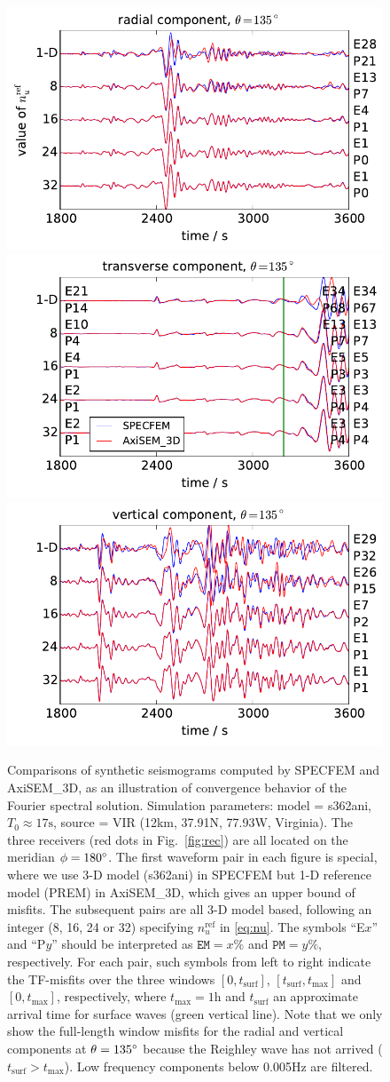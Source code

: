 \documentclass[extra,referee]{gji}
\begin{document}
\begin{figure}
  \includegraphics[width=.35\textwidth]{fig/conv_seism/VIR_s3_17_135xxx_R.pdf}\hspace{-15pt}
  \includegraphics[width=.35\textwidth]{fig/conv_seism/VIR_s3_17_135xxx_T.pdf}\hspace{-15pt}
  \includegraphics[width=.35\textwidth]{fig/conv_seism/VIR_s3_17_135xxx_Z.pdf}\vspace{-5pt}
  \caption{Comparisons of synthetic seismograms computed by SPECFEM and AxiSEM\_3D,
  as an illustration of convergence behavior of the Fourier spectral solution. 
  Simulation parameters: model = s362ani, $T_0\approx17\text{s}$, 
  source = VIR (12km, 37.91\degr N, 77.93\degr W, Virginia).
  The three receivers (red dots in Fig.~\ref{fig:rec})
  are all located on the meridian $\phi=180\hbox{$^\circ$}$. 
  The first waveform pair in each figure is special, where we use 3-D model (s362ani)
  in SPECFEM but 1-D reference model (PREM) in AxiSEM\_3D, which gives
  an upper bound of misfits. The subsequent pairs are all 3-D model based, 
  following an integer (8, 16, 24 or 32) specifying $n_u^\text{ref}$ in \eqref{eq:nu}. 
  The symbols ``E$x$'' and ``P$y$'' should be interpreted as 
  $\mathtt{EM}=x\%$ and $\mathtt{PM}=y\%$, respectively.
  For each pair, such symbols from left to right indicate the TF-misfits 
  over the three windows $[0,t_\text{surf}]$, $[t_\text{surf},t_\text{max}]$ 
  and $[0,t_\text{max}]$, respectively,
  where $t_\text{max}=1\text{h}$ and
  $t_\text{surf}$ an approximate arrival time for surface waves 
  (green vertical line). Note that we only show the 
  full-length window misfits for the radial and vertical components
  at $\theta=135\hbox{$^\circ$}$ because the Reighley wave has not arrived 
  ($t_\text{surf}>t_\text{max}$).
  Low frequency components below 0.005Hz are filtered.}
  \label{fig:empml}
\end{figure}
\end{document}
